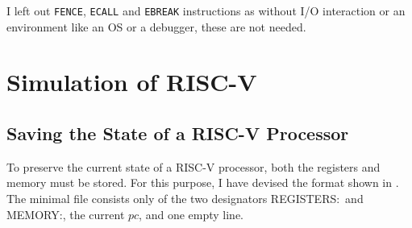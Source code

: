 I left out \texttt{FENCE}, \texttt{ECALL} and \texttt{EBREAK} instructions as
without I/O interaction or an environment like an OS or a debugger, these are
not needed.

\section{Simulation of RISC-V}

\subsection{Saving the State of a RISC-V Processor}\label{sub:statefile}
To preserve the current state of a RISC-V processor, both the registers and
memory must be stored. For this purpose, I have devised the format shown in
. The minimal file consists only of the two designators
\dq REGISTERS:\dq\ and \dq MEMORY:\dq, the current $pc$, and one empty line.

